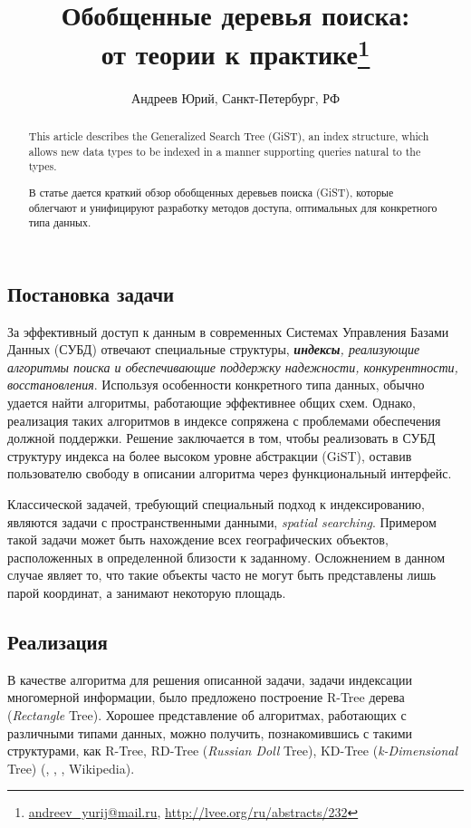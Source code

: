 \documentclass[10pt, a5paper]{article}
\begin{document}
\title{Обобщенные деревья поиска: \\[2mm] от теории к практике\footnote{\url{andreev_yurij@mail.ru}, \url{http://lvee.org/ru/abstracts/232}}}
\author{Андреев Юрий, Санкт-Петербург, РФ}
\maketitle
\begin{abstract}

This article describes the Generalized Search Tree (GiST), an index structure, 
which allows new data types to be indexed in a manner supporting queries natural to the types.

В статье дается краткий обзор обобщенных деревьев поиска (GiST),
которые облегчают и унифицируют разработку методов доступа, оптимальных для конкретного типа данных.
\end{abstract}

\subsection*{Постановка задачи}
За эффективный доступ к данным в современных Системах Управления Базами Данных (СУБД) 
отвечают специальные структуры, \textit{\textbf{индексы}, реализующие алгоритмы поиска
и обеспечивающие поддержку надежности, конкурентности, восстановления}.
Используя особенности конкретного типа данных, обычно удается найти алгоритмы,
работающие эффективнее общих схем.
Однако, реализация таких алгоритмов в индексе сопряжена с проблемами обеспечения должной поддержки.
Решение заключается в том, чтобы реализовать в СУБД структуру индекса на более высоком уровне абстракции (GiST),
оставив пользователю свободу в описании алгоритма через функциональный интерфейс. 

Классической задачей, требующий специальный подход к индексированию, являются
задачи с пространственными данными, \textit{spatial searching}. Примером такой задачи
может быть нахождение всех географических объектов, расположенных в определенной близости к заданному.
Осложнением в данном случае являет то, что такие объекты часто не могут быть представлены лишь парой координат,
а занимают некоторую площадь.  

\subsection*{Реализация}
В качестве алгоритма для решения описанной задачи, задачи индексации многомерной информации, 
было предложено построение R-Tree дерева (\textit{Rectangle} Tree).
Хорошее представление об алгоритмах, работающих с различными типами данных, можно получить,
познакомившись с такими структурами, как R-Tree, RD-Tree (\textit{Russian Doll} Tree), KD-Tree (\textit{k-Dimensional} Tree) 
(\cite{DB}, \cite{R-Tree}, \cite{RD-Tree}, Wikipedia).
\end{document}
